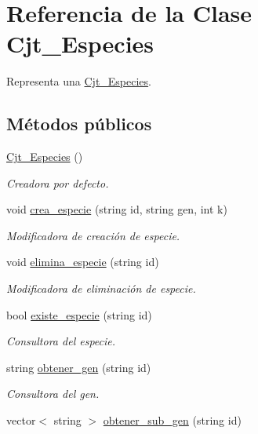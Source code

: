 \hypertarget{class_cjt___especies}{}\section{Referencia de la Clase Cjt\+\_\+\+Especies}
\label{class_cjt___especies}


Representa una \hyperlink{class_cjt___especies}{Cjt\+\_\+\+Especies}.  


\subsection*{Métodos públicos}
\begin{DoxyCompactItemize}
\item 
\hyperlink{class_cjt___especies_ae423b9d5a456158136c17d9210c90c2e}{Cjt\+\_\+\+Especies} ()
\begin{DoxyCompactList}\small\item\em Creadora por defecto. \end{DoxyCompactList}\item 
void \hyperlink{class_cjt___especies_a8c90cec35ff5469f0b8e193308569e4b}{crea\+\_\+especie} (string id, string gen, int k)
\begin{DoxyCompactList}\small\item\em Modificadora de creación de especie. \end{DoxyCompactList}\item 
void \hyperlink{class_cjt___especies_aef76f607ead23a635d7a8b2c9a844327}{elimina\+\_\+especie} (string id)
\begin{DoxyCompactList}\small\item\em Modificadora de eliminación de especie. \end{DoxyCompactList}\item 
bool \hyperlink{class_cjt___especies_a39a4191697228fea8780516f4cd5da85}{existe\+\_\+especie} (string id)
\begin{DoxyCompactList}\small\item\em Consultora del especie. \end{DoxyCompactList}\item 
string \hyperlink{class_cjt___especies_af5821877f200218836053864ba8e9462}{obtener\+\_\+gen} (string id)
\begin{DoxyCompactList}\small\item\em Consultora del gen. \end{DoxyCompactList}\item 
vector$<$ string $>$ \hyperlink{class_cjt___especies_a8b79c4a271c4d5e4f6c3aa1b8b69b9ec}{obtener\+\_\+sub\+\_\+gen} (string id)

\end{DoxyCompactItemize}
